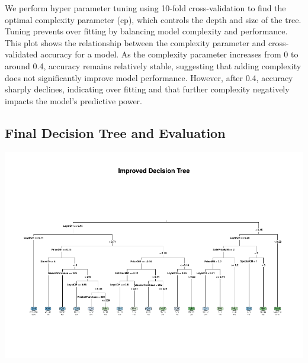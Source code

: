 \documentclass[
]{article}
\newenvironment{Shaded}{\begin{snugshade}}{\end{snugshade}}
\newcommand{\AttributeTok}[1]{\textcolor[rgb]{0.13,0.29,0.53}{#1}}
\newcommand{\ConstantTok}[1]{\textcolor[rgb]{0.56,0.35,0.01}{#1}}
\newcommand{\DecValTok}[1]{\textcolor[rgb]{0.00,0.00,0.81}{#1}}
\newcommand{\FunctionTok}[1]{\textcolor[rgb]{0.13,0.29,0.53}{\textbf{#1}}}
\newcommand{\NormalTok}[1]{#1}
\newcommand{\OtherTok}[1]{\textcolor[rgb]{0.56,0.35,0.01}{#1}}
\newcommand{\SpecialCharTok}[1]{\textcolor[rgb]{0.81,0.36,0.00}{\textbf{#1}}}
\newcommand{\StringTok}[1]{\textcolor[rgb]{0.31,0.60,0.02}{#1}}
\begin{document}
We perform hyper parameter tuning using 10-fold cross-validation to find
the optimal complexity parameter (cp), which controls the depth and size
of the tree. Tuning prevents over fitting by balancing model complexity
and performance. This plot shows the relationship between the complexity
parameter and cross-validated accuracy for a model. As the complexity
parameter increases from 0 to around 0.4, accuracy remains relatively
stable, suggesting that adding complexity does not significantly improve
model performance. However, after 0.4, accuracy sharply declines,
indicating over fitting and that further complexity negatively impacts
the model's predictive power.

\hypertarget{final-decision-tree-and-evaluation}{%
\subsection{Final Decision Tree and
Evaluation}\label{final-decision-tree-and-evaluation}}

\begin{Shaded}
\end{Shaded}

\includegraphics{OJ_files/figure-latex/unnamed-chunk-11-1.pdf}
\end{document}
